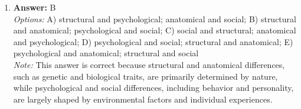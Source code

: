\documentclass[12pt]{article}
\begin{document}
\begin{enumerate}[label=\arabic*.]
\\ \textit{Note:} If the incidence rate of the disease falls while the number of existing cases remains the same, the prevalence will increase because prevalence is calculated as the total number of cases (existing plus new) in a population at a given time, and a lower incidence means fewer new cases are added to the population.
\item \textbf{Answer:} B
\\ \textit{Options:} A) structural and psychological; anatomical and social; B) structural and anatomical; psychological and social; C) social and structural; anatomical and psychological; D) psychological and social; structural and anatomical; E) psychological and anatomical; structural and social
\\ \textit{Note:} This answer is correct because structural and anatomical differences, such as genetic and biological traits, are primarily determined by nature, while psychological and social differences, including behavior and personality, are largely shaped by environmental factors and individual experiences.
\end{enumerate}
\end{document}
